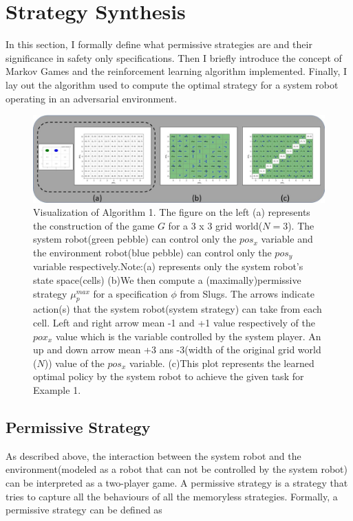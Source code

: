 \documentclass[letterpaper, 10 pt, conference]{ieeeconf}  %
\begin{document}
\section{Strategy Synthesis}

In this section, I formally define what permissive strategies are and their significance in safety only specifications. Then I briefly introduce the concept of Markov Games and the reinforcement learning algorithm implemented. Finally, I lay out the algorithm used to compute the optimal strategy for a system robot operating in an adversarial environment.

\begin{figure}[t]
    \centering
    \includegraphics[width=\textwidth]{images/trimmed_algo_vis_hq.jpg}
    \caption{Visualization of Algorithm 1. The figure on the left (a) represents the construction of the game $G$ for a 3 x 3 grid world($N = 3$). The system robot(green pebble) can control only the $pos_x$ variable and the environment robot(blue pebble) can control only the $pos_y$ variable respectively.Note:(a) represents only the system robot's state space(cells) (b)We then compute a (maximally)permissive strategy $\mu_p^{max}$ for a specification $\phi$ from Slugs. The arrows indicate action(s) that the system robot(system strategy) can take from each cell. Left and right arrow mean -1 and +1 value respectively of the $pox_x$ value which is the variable controlled by the system player. An up and down arrow mean +3 ans -3(width of the original grid world ($N$)) value of the $pos_x$ variable. (c)This plot represents the learned optimal policy by the system robot to achieve the given task for Example 1.}
\label{fig:my_label}
\end{figure}

\subsection{Permissive Strategy}

As described above, the interaction between the system robot and the environment(modeled as a robot that can not be controlled by the system robot) can be interpreted as a two-player game.  A permissive strategy is a strategy that tries to capture all the behaviours of all the memoryless strategies. Formally, a permissive strategy can be defined as\\
\end{document}
